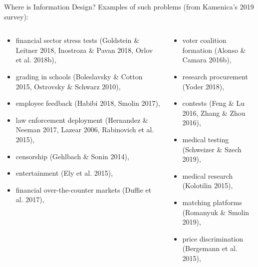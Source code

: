 \documentclass[english,10pt
,aspectratio=169
]{beamer}
\begin{document}
\begin{frame}{Where is Information Design?}
	Examples of such problems (from Kamenica's 2019 survey):
	\begin{columns}
		\begin{column}{0.5\linewidth}
			\begin{itemize}
				\footnotesize
				\item financial sector stress tests (Goldstein \& Leitner 2018, Inostroza \&
				Pavan 2018, Orlov et al. 2018b), 
				
				\item grading in schools (Boleslavsky \& Cotton 2015, Ostrovsky \&
				Schwarz 2010), 
				
				\item employee feedback (Habibi 2018, Smolin 2017), 
				
				\item law enforcement deployment (Hernandez \& Neeman 2017, Lazear 2006, Rabinovich et al. 2015), 
				
				\item censorship (Gehlbach \& Sonin 2014), 
				
				\item entertainment (Ely et al. 2015), 
				
				\item financial over-the-counter markets (Duffie et al. 2017),
			\end{itemize}
		\end{column}
		\begin{column}{0.5\linewidth}
			\begin{itemize}
				\footnotesize
				\item voter coalition formation (Alonso \& Camara 2016b), 
				
				\item research procurement (Yoder 2018), 
				
				\item contests (Feng \& Lu 2016, Zhang \& Zhou 2016), 
				
				\item medical testing (Schweizer \& Szech 2019), 
				
				\item medical research (Kolotilin 2015), 
				
				\item matching platforms (Romanyuk \& Smolin 2019), 
				
				\item price discrimination (Bergemann et al. 2015), 
				

\end{itemize}
\end{column}
\end{columns}
\end{frame}
\end{document}
